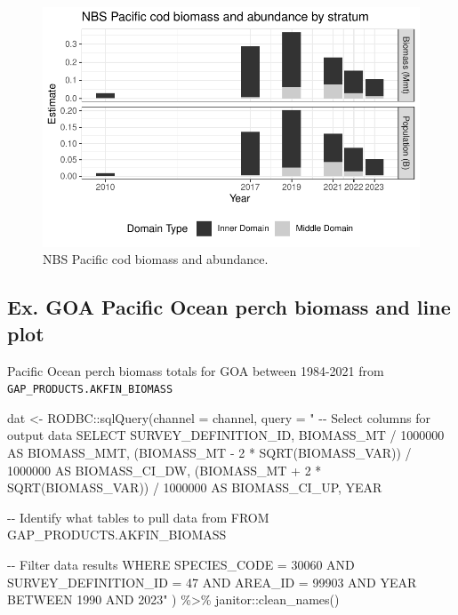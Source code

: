\documentclass[
  letterpaper,
  oneside,
  open=any]{scrbook}
\newenvironment{Shaded}{\begin{snugshade}}{\end{snugshade}}
\newcommand{\AttributeTok}[1]{\textcolor[rgb]{0.40,0.45,0.13}{#1}}
\newcommand{\FunctionTok}[1]{\textcolor[rgb]{0.28,0.35,0.67}{#1}}
\newcommand{\NormalTok}[1]{\textcolor[rgb]{0.00,0.23,0.31}{#1}}
\newcommand{\OtherTok}[1]{\textcolor[rgb]{0.00,0.23,0.31}{#1}}
\newcommand{\SpecialCharTok}[1]{\textcolor[rgb]{0.37,0.37,0.37}{#1}}
\newcommand{\StringTok}[1]{\textcolor[rgb]{0.13,0.47,0.30}{#1}}
\begin{document}
\begin{figure}[H]

{\centering \includegraphics{content/akfin-oracle-sql-r_files/figure-pdf/test-4-fig-1.pdf}

}

\caption{NBS Pacific cod biomass and abundance.}

\end{figure}%

\subsection{Ex. GOA Pacific Ocean perch biomass and line
plot}\label{ex.-goa-pacific-ocean-perch-biomass-and-line-plot}

Pacific Ocean perch biomass totals for GOA between 1984-2021 from
\texttt{GAP\_PRODUCTS.AKFIN\_BIOMASS}

\begin{Shaded}
\begin{Highlighting}[]
\NormalTok{dat }\OtherTok{\textless{}{-}}\NormalTok{ RODBC}\SpecialCharTok{::}\FunctionTok{sqlQuery}\NormalTok{(}\AttributeTok{channel =}\NormalTok{ channel,}
                       \AttributeTok{query =} \StringTok{"}
\StringTok{{-}{-} Select columns for output data}
\StringTok{SELECT}
\StringTok{SURVEY\_DEFINITION\_ID,}
\StringTok{BIOMASS\_MT / 1000000 AS BIOMASS\_MMT,}
\StringTok{(BIOMASS\_MT {-} 2 * SQRT(BIOMASS\_VAR)) / 1000000 AS BIOMASS\_CI\_DW,}
\StringTok{(BIOMASS\_MT + 2 * SQRT(BIOMASS\_VAR)) / 1000000 AS BIOMASS\_CI\_UP,}
\StringTok{YEAR}

\StringTok{{-}{-} Identify what tables to pull data from}
\StringTok{FROM GAP\_PRODUCTS.AKFIN\_BIOMASS}

\StringTok{{-}{-} Filter data results}
\StringTok{WHERE SPECIES\_CODE = 30060}
\StringTok{AND SURVEY\_DEFINITION\_ID = 47}
\StringTok{AND AREA\_ID = 99903}
\StringTok{AND YEAR BETWEEN 1990 AND 2023"}\NormalTok{ ) }\SpecialCharTok{\%\textgreater{}\%} 
\NormalTok{  janitor}\SpecialCharTok{::}\FunctionTok{clean\_names}\NormalTok{()}
\end{Highlighting}
\end{Shaded}
\end{document}
